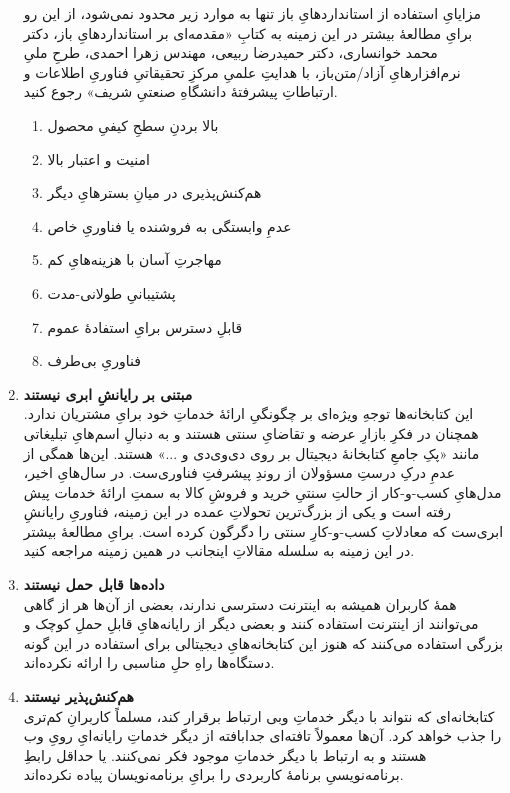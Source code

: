 \documentclass[]{article}
\begin{document}
\begin{enumerate}
مزایایِ استفاده از استانداردهایِ باز تنها به موارد زیر محدود نمی‌شود، از این رو برایِ مطالعهٔ بیشتر در این زمینه به کتابِ «مقدمه‌ای بر استانداردهایِ باز، دکتر محمد خوانساری، دکتر حمیدرضا ربیعی، مهندس زهرا احمدی، طرحِ ملیِ نرم‌افزارهایِ آزاد/متن‌باز، با هدایتِ علمیِ مرکزِ تحقیقاتیِ فناوریِ اطلاعات و ارتباطاتِ پیشرفتهٔ دانشگاهِ صنعتیِ شریف» رجوع کنید.
	\begin{enumerate}
		\item بالا بردنِ سطحِ کیفیِ محصول
		\item امنیت و اعتبار بالا
		\item هم‌کنش‌پذیری  در میانِ بسترهایِ دیگر
		\item عدمِ وابستگی به فروشنده یا فناوریِ خاص
		\item مهاجرتِ آسان با هزینه‌هایِ کم
		\item پشتیبانیِ طولانی-مدت
		\item قابلِ دسترس برایِ استفادهٔ عموم
		\item فناوریِ بی‌طرف
	\end{enumerate}
\item \textbf{مبتنی بر رایانشِ ابری نیستند}\\
این کتابخانه‌ها توجهِ ویژه‌ای بر چگونگیِ ارائهٔ خدماتِ خود برایِ مشتریان ندارد. همچنان در فکرِ بازارِ عرضه و تقاضایِ سنتی هستند و به دنبالِ اسم‌هایِ تبلیغاتی مانند «پکِ جامعِ کتابخانهٔ دیجیتال بر روی دی‌وی‌دی و ...» هستند. این‌ها همگی از عدمِ درکِ درستِ مسؤولان از روندِ پیشرفتِ فناوری‌ست. در سال‌هایِ اخیر، مدل‌هایِ کسب-و-کار از حالتِ سنتیِ خرید و فروشِ کالا به سمتِ ارائهٔ خدمات پیش رفته است و یکی از بزرگ‌ترین تحولاتِ عمده در این زمینه، فناوریِ رایانشِ ابری‌ست که معادلاتِ کسب-و-کارِ سنتی را دگرگون کرده است. برایِ مطالعهٔ بیشتر در این زمینه به سلسله مقالاتِ اینجانب در همین زمینه مراجعه کنید.
\item \textbf{داده‌ها قابل حمل نیستند}\\
همهٔ کاربران همیشه به اینترنت دسترسی ندارند، بعضی از آن‌ها هر از گاهی می‌توانند از اینترنت استفاده کنند و بعضی دیگر از رایانه‌هایِ قابلِ حملِ کوچک و بزرگی استفاده می‌کنند که هنوز این کتابخانه‌هایِ دیجیتالی برای استفاده در این گونه دستگاه‌ها راهِ حلِ مناسبی را ارائه نکرده‌اند.
\item \textbf{هم‌کنش‌پذیر نیستند}\\
کتابخانه‌ای که نتواند با دیگر خدماتِ وبی ارتباط برقرار کند، مسلماً کاربرانِ کم‌تری را جذب خواهد کرد. آن‌ها معمولاً تافته‌ای جدابافته از دیگر خدماتِ رایانه‌ایِ رویِ وب هستند و به ارتباط با دیگر خدماتِ موجود فکر نمی‌کنند. یا حداقل رابطِ برنامه‌نویسیِ برنامهٔ کاربردی را برایِ برنامه‌نویسان پیاده نکرده‌اند.

\end{enumerate}
\end{document}
